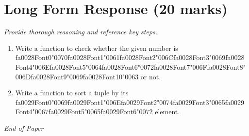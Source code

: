 \documentclass[12pt]{article}
\begin{document}
\section*{Long Form Response (20 marks)}
\textit{Provide thorough reasoning and reference key steps.}
\begin{enumerate}[label=\arabic*.]
\item Write a function to check whether the given number is {\csname fa0028Font0\endcsname\char"0070}{\csname fa0028Font1\endcsname\char"0061}{\csname fa0028Font2\endcsname\char"006C}{\csname fa0028Font3\endcsname\char"0069}{\csname fa0028Font4\endcsname\char"006E}{\csname fa0028Font5\endcsname\char"0064}{\csname fa0028Font6\endcsname\char"0072}{\csname fa0028Font7\endcsname\char"006F}{\csname fa0028Font8\endcsname\char"006D}{\csname fa0028Font9\endcsname\char"0069}{\csname fa0028Font10\endcsname\char"0063} or not.
\item Write a function to sort a tuple by its {\csname fa0029Font0\endcsname\char"0069}{\csname fa0029Font1\endcsname\char"006E}{\csname fa0029Font2\endcsname\char"0074}{\csname fa0029Font3\endcsname\char"0065}{\csname fa0029Font4\endcsname\char"0067}{\csname fa0029Font5\endcsname\char"0065}{\csname fa0029Font6\endcsname\char"0072} element.
\end{enumerate}

\vfill
\noindent\textit{End of Paper}
\end{document}
